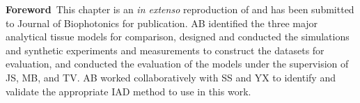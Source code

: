 \begin{center}
\begin{minipage}[b]{0.9\linewidth}
\small
\textbf{Foreword\,}
This chapter is an \emph{in extenso} reproduction of \cite{Bahl2023a} and has been submitted to Journal of Biophotonics for publication. 
\newline
AB identified the three major analytical tissue models for comparison, designed and conducted the simulations and synthetic experiments and measurements to construct the datasets for evaluation, and conducted the evaluation of the models under the supervision of JS, MB, and TV. AB worked collaboratively with SS and YX to identify and validate the appropriate IAD method to use in this work. 
\end{minipage}
\end{center}

\minitoc


